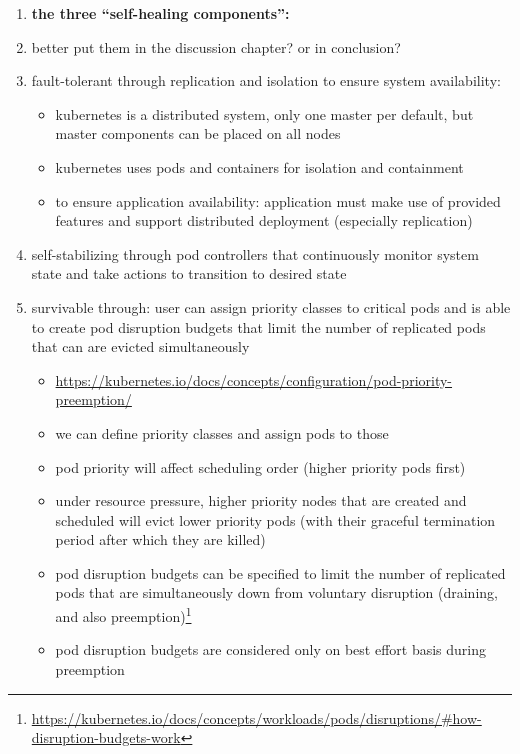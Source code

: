   \begin{enumerate}
    \item \textbf{the three \enquote{self-healing components}:}
    \item better put them in the discussion chapter? or in conclusion?
    \item fault-tolerant through replication and isolation to ensure system availability:
      \begin{itemize}
      \item \gls{kubernetes} is a distributed system, only one master per default, but master components can be placed on all nodes
      \item \gls{kubernetes} uses pods and containers for isolation and containment
      \item to ensure application availability: application must make use of provided features and support distributed deployment (especially replication)
    \end{itemize}
    \item self-stabilizing through pod controllers that continuously monitor system state and take actions to transition to desired state
    \item survivable through: user can assign priority classes to critical pods and is able to create pod disruption budgets that limit the number of replicated pods that can are evicted simultaneously
      \begin{itemize}
        \item \url{https://kubernetes.io/docs/concepts/configuration/pod-priority-preemption/}
        \item we can define priority classes and assign pods to those
        \item pod priority will affect scheduling order (higher priority pods first)
        \item under resource pressure, higher priority nodes that are created and scheduled will evict lower priority pods (with their graceful termination period after which they are killed)
        \item pod disruption budgets can be specified to limit the number of replicated pods that are simultaneously down from voluntary disruption (draining, and also preemption)\footnote{\url{https://kubernetes.io/docs/concepts/workloads/pods/disruptions/\#how-disruption-budgets-work}}
        \item pod disruption budgets are considered only on best effort basis during preemption
      \end{itemize}
  \end{enumerate}